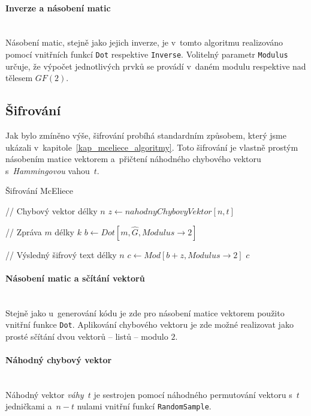 \documentclass[thesis=M,czech,hidelinks]{FITthesis}[2012/06/26]
\newcommand{\0}{{\textcolor[gray]{0.75}{0}}}
\newenvironment{algoritmus}{
    \floatname{algorithm}{Algoritmus}
    \begin{algorithm}
}{\end{algorithm}}
\begin{document}
\paragraph{Inverze a násobení matic} \hfil \\
Násobení matic, stejně jako jejich inverze, je v~tomto algoritmu realizováno
pomocí vnitřních funkcí \texttt{Dot} respektive \texttt{Inverse}. Volitelný
parametr \texttt{Modulus} určuje, že výpočet jednotlivých prvků se provádí
v~daném modulu respektive nad tělesem $GF(2)$.


\subsection{Šifrování}\label{kap_mceliece_sifrovani}

Jak bylo zmíněno výše, šifrování probíhá standardním způsobem, který jsme
ukázali v~kapitole~\ref{kap_mceliece_algoritmy}. Toto šifrování je vlastně
prostým násobením matice vektorem a~přičtení náhodného chybového vektoru
s~\emph{Hammingovou} vahou~$t$.

\begin{algoritmus}[!ht]
    \caption{Šifrování McEliece}
    \begin{algorithmic}[1]

        // Chybový vektor délky $n$
        \State $ z \gets nahodnyChybovyVektor[ n, t ] $

        // Zpráva $m$ délky $k$
        \State $ b \gets Dot[ m, \hat{G}, Modulus\to2 ] $

        // Výsledný šifrový text délky $n$
        \State $ c \gets Mod[ b + z, Modulus\to2 ] $
        \State \Return $ c $
     \EndFunction
    \end{algorithmic}
\end{algoritmus}


\paragraph{Násobení matic a sčítání vektorů} \hfil \\
Stejně jako u~generování kódu je zde pro násobení matice vektorem použito
vnitřní funkce \texttt{Dot}.  Aplikování chybového vektoru je zde možné
realizovat jako prosté sčítání dvou vektorů -- listů -- modulo $2$.


\paragraph{Náhodný chybový vektor} \hfil \\
Náhodný vektor \emph{váhy}~$t$ je sestrojen pomocí náhodného permutování vektoru
s~$t$ jedničkami a~$n-t$ nulami vnitřní funkcí \texttt{RandomSample}.
\end{document}
